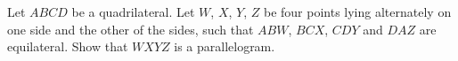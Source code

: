 Let $ABCD$ be a quadrilateral. Let $W$, $X$, $Y$, $Z$ be four points lying alternately on one side and the other of the sides, such that $ABW$, $BCX$, $CDY$ and $DAZ$ are equilateral. Show that $WXYZ$ is a parallelogram.
